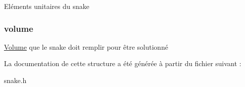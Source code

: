 Eléments unitaires du snake \hypertarget{struct_snake_a9bc498ccac8db41438f855f5dd3f4c05}{
\subsubsection[{volume}]{\setlength{\rightskip}{0pt plus 5cm}volume}}\label{struct_snake_a9bc498ccac8db41438f855f5dd3f4c05}
\hyperlink{struct_volume}{Volume} que le snake doit remplir pour être solutionné 

La documentation de cette structure a été générée à partir du fichier suivant \-:\begin{DoxyCompactItemize}
\item 
snake.\-h\end{DoxyCompactItemize}
